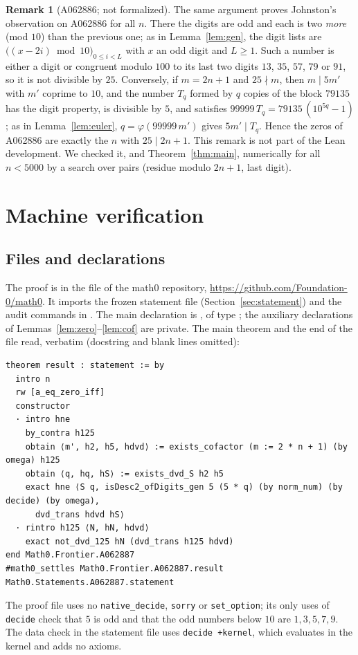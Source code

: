 \documentclass[11pt]{amsart}
\theoremstyle{plain}
\theoremstyle{definition}
\newtheorem{remark}[theorem]{Remark}
\begin{document}
\begin{remark}[A062886; not formalized]\label{rem:886}
The same argument proves Johnston's observation on A062886 \cite{A062886} for all $n$. There the digits are odd and each is two \emph{more} (mod $10$) than the previous one; as in Lemma~\ref{lem:gen}, the digit lists are $\bigl((x-2i)\bmod10\bigr)_{0\le i<L}$ with $x$ an odd digit and $L\ge1$. Such a number is either a digit or congruent modulo $100$ to its last two digits $13$, $35$, $57$, $79$ or $91$, so it is not divisible by $25$. Conversely, if $m=2n+1$ and $25\nmid m$, then $m\mid 5m'$ with $m'$ coprime to $10$, and the number $T_q$ formed by $q$ copies of the block $79135$ has the digit property, is divisible by $5$, and satisfies $99999\,T_q=79135\,(10^{5q}-1)$; as in Lemma~\ref{lem:euler}, $q=\varphi(99999\,m')$ gives $5m'\mid T_q$. Hence the zeros of A062886 are exactly the $n$ with $25\mid 2n+1$.
This remark is not part of the Lean development. We checked it, and Theorem~\ref{thm:main}, numerically for all $n<5000$ by a search over pairs (residue modulo $2n+1$, last digit).
\end{remark}

\section{Machine verification}\label{sec:lean}

\subsection*{Files and declarations}
The proof is in the file  of the math0 repository, \url{https://github.com/Foundation-0/math0}. It imports the frozen statement file  (Section~\ref{sec:statement}) and the audit commands in . The main declaration is , of type ; the auxiliary declarations of Lemmas~\ref{lem:zero}--\ref{lem:cof} are private. The main theorem and the end of the file read, verbatim (docstring and blank lines omitted):
\begin{lstlisting}
theorem result : statement := by
  intro n
  rw [a_eq_zero_iff]
  constructor
  · intro hne
    by_contra h125
    obtain ⟨m', h2, h5, hdvd⟩ := exists_cofactor (m := 2 * n + 1) (by omega) h125
    obtain ⟨q, hq, hS⟩ := exists_dvd_S h2 h5
    exact hne ⟨S q, isDesc2_ofDigits_gen 5 (5 * q) (by norm_num) (by decide) (by omega),
      dvd_trans hdvd hS⟩
  · rintro h125 ⟨N, hN, hdvd⟩
    exact not_dvd_125 hN (dvd_trans h125 hdvd)
end Math0.Frontier.A062887
#math0_settles Math0.Frontier.A062887.result Math0.Statements.A062887.statement
\end{lstlisting}
The proof file uses no \texttt{native\_decide}, \texttt{sorry} or \texttt{set\_option}; its only uses of \texttt{decide} check that $5$ is odd and that the odd numbers below $10$ are $1,3,5,7,9$. The data check  in the statement file uses \texttt{decide +kernel}, which evaluates in the kernel and adds no axioms.
\end{document}
